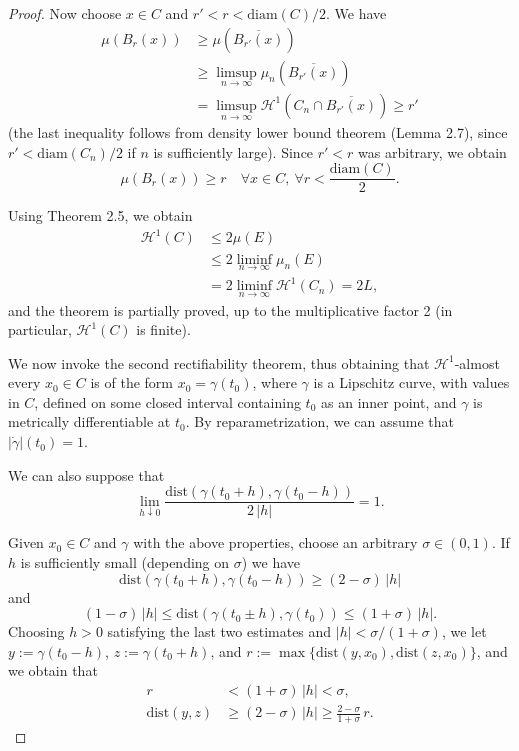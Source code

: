 \documentclass[12pt]{article}
\begin{document}
{\begin{proof}
\indent Now choose $x \in C$ and $r' < r < \mathrm{diam}(C)/2$. We have
\begin{align*}
    \mu\!\left(B_r(x)\right)
        &\geqslant \mu\!\left(\overline{B_{r'}(x)}\right) \\
        &\geqslant \limsup_{n \to \infty} \mu_n\!\left(\overline{B_{r'}(x)}\right) \\
        &= \limsup_{n \to \infty} \mathcal{H}^1\!\left(C_n \cap \overline{B_{r'}(x)}\right) \geqslant r'
\end{align*}
(the last inequality follows from density lower bound theorem (Lemma 2.7), since $r' < \mathrm{diam}(C_n)/2$
if $n$ is sufficiently large). Since $r' < r$ was arbitrary, we obtain
\[
    \mu\!\left(B_r(x)\right) \geqslant r \quad \forall x \in C,\ \forall r < \frac{\mathrm{diam}(C)}{2}.
\]

Using Theorem 2.5, we obtain
\begin{align*}
    \mathcal{H}^1(C) &\leqslant 2\mu(E) \\
                     &\leqslant 2 \liminf_{n \to \infty} \mu_n(E) \\
                     &= 2 \liminf_{n \to \infty} \mathcal{H}^1(C_n) = 2L,
\end{align*}
and the theorem is partially proved, up to the multiplicative factor 2
(in particular, $\mathcal{H}^1(C)$ is finite).

\indent We now invoke the second rectifiability theorem, thus obtaining that $\mathcal{H}^1$-almost every
$x_0 \in C$ is of the form $x_0 = \gamma(t_0)$, where $\gamma$ is a Lipschitz curve, with
values in $C$, defined on some closed interval containing $t_0$ as an inner
point, and $\gamma$ is metrically differentiable at $t_0$. By reparametrization, we
can assume that $|\dot{\gamma}|(t_0) = 1$.

\indent We can also suppose that
\[
    \lim_{h \downarrow 0} \frac{\mathrm{dist}\!\left(\gamma(t_0 + h), \gamma(t_0 - h)\right)}{2\,|h|} = 1.
\]

Given $x_0 \in C$ and $\gamma$ with the above properties, choose an arbitrary
$\sigma \in (0, 1)$. If $h$ is sufficiently small (depending on $\sigma$) we have
\[
    \mathrm{dist}\!\left(\gamma(t_0 + h), \gamma(t_0 - h)\right) \geqslant (2 - \sigma)\,|h|
\]
and
\[
    (1 - \sigma)\,|h| \leqslant \mathrm{dist}\!\left(\gamma(t_0 \pm h), \gamma(t_0)\right) \leqslant (1 + \sigma)\,|h|.
\]
Choosing $h > 0$ satisfying the last two estimates and $|h| < \sigma/(1+\sigma)$, we
let $y := \gamma(t_0 - h)$, $z := \gamma(t_0 + h)$, and $r := \max\{\mathrm{dist}(y, x_0), \mathrm{dist}(z, x_0)\}$,
and we obtain that
\begin{align*}
    r &< (1 + \sigma)\,|h| < \sigma, \\
    \mathrm{dist}(y, z) &\geqslant (2 - \sigma)\,|h| \geqslant \frac{2 - \sigma}{1 + \sigma}\,r.
\end{align*}


\end{proof}}
\end{document}
